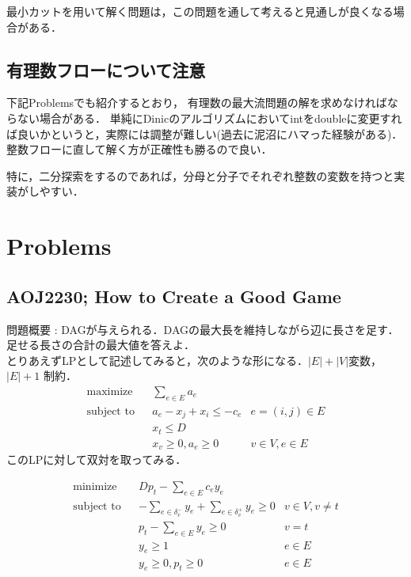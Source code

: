 \documentclass[13pt, a4paper, landscape]{jarticle}
\theoremstyle{nonitalic} %
\begin{document}
最小カットを用いて解く問題は，この問題を通して考えると見通しが良くなる場合がある．



\subsection{有理数フローについて注意}

下記Problemsでも紹介するとおり， 有理数の最大流問題の解を求めなければならない場合がある． 単純にDinicのアルゴリズムにおいてintをdoubleに変更すれば良いかというと，実際には調整が難しい(過去に泥沼にハマった経験がある)． 整数フローに直して解く方が正確性も勝るので良い．

特に，二分探索をするのであれば，分母と分子でそれぞれ整数の変数を持つと実装がしやすい．



\section{Problems}

\subsection{AOJ2230; How to Create a Good Game}

問題概要 : DAGが与えられる．DAGの最大長を維持しながら辺に長さを足す．足せる長さの合計の最大値を答えよ．\\

とりあえずLPとして記述してみると，次のような形になる．$|E|+|V|$変数， $|E|+1$ 制約．
\begin{align}
 &&&&&\textrm{maximize}   && \sum_{e \in E} a_e \\
 &&&&&\textrm{subject to} && a_e - x_j + x_i \leq - c_e & e = (i,j) \in E  &&&&&\\
 &&&&&                    && x_t \leq  D &&&&&& \\
 &&&&&                    && x_v \geq 0, a_e \geq 0 & v \in V, e \in E &&&&&
\end{align}
このLPに対して双対を取ってみる．

\begin{align}
  &&&&& \textrm{minimize}   && Dp_t - \sum_{e \in E} c_e y_e \\
  &&&&& \textrm{subject to} && -\sum_{e \in \delta_v^- } y_e + \sum_{e \in \delta_v^+ } y_e \geq 0 & v \in V, v\neq t &&&&&\\
  &&&&&                     && p_t - \sum_{e \in E} y_e \geq 0 & v=t \\
  &&&&&                     && y_e \geq 1  & e \in E\\
  &&&&&                     && y_e \geq 0, p_t \geq 0 & e\in E
\end{align}
\end{document}
